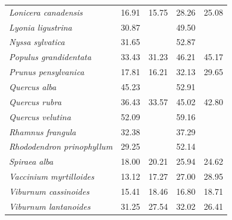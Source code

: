 \documentclass{article}
\begin{document}
\begin{table}[ht]
\begin{tabular}{lrrrr}
  \textit{Lonicera canadensis} & 16.91 & 15.75 & 28.26 & 25.08 \\ 
  \textit{Lyonia ligustrina} & 30.87 &  & 49.50 &  \\ 
  \textit{Nyssa sylvatica} & 31.65 &  & 52.87 &  \\ 
  \textit{Populus grandidentata} & 33.43 & 31.23 & 46.21 & 45.17 \\ 
  \textit{Prunus pensylvanica} & 17.81 & 16.21 & 32.13 & 29.65 \\ 
  \textit{Quercus alba} & 45.23 &  & 52.91 &  \\ 
  \textit{Quercus rubra} & 36.43 & 33.57 & 45.02 & 42.80 \\ 
  \textit{Quercus velutina} & 52.09 &  & 59.16 &  \\ 
  \textit{Rhamnus frangula} & 32.38 &  & 37.29 &  \\ 
  \textit{Rhododendron prinophyllum} & 29.25 &  & 52.14 &  \\ 
  \textit{Spiraea alba} & 18.00 & 20.21 & 25.94 & 24.62 \\ 
  \textit{Vaccinium myrtilloides} & 13.12 & 17.27 & 27.00 & 28.95 \\ 
  \textit{Viburnum cassinoides} & 15.41 & 18.46 & 16.80 & 18.71 \\ 
  \textit{Viburnum lantanoides} & 31.25 & 27.54 & 32.02 & 26.41 \\ 
   \hline
\end{tabular}
\end{table}
\newpage
\end{document}
